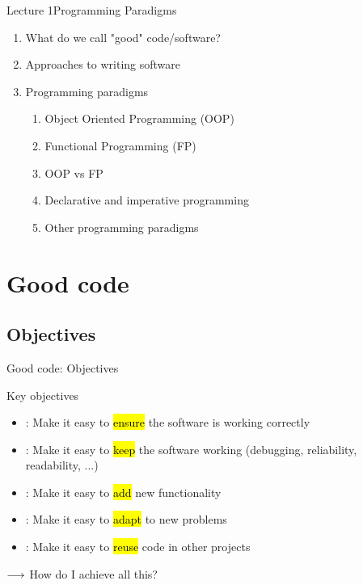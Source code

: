 \begin{frame}{Lecture 1}{Programming Paradigms}
	\begin{enumerate}
		\setlength{\itemsep}{3ex}
		\item What do we call "good" code/software?
		\item Approaches to writing software
		\item Programming paradigms\vspace{1ex}
		\begin{enumerate}[a]
			\setlength{\itemsep}{1ex}
			\item Object Oriented Programming (OOP)
			\item Functional Programming (FP)
			\item OOP vs FP
			\item Declarative and imperative programming
			\item Other programming paradigms
		\end{enumerate}
	\end{enumerate}
\end{frame}

\section{Good code}


\subsection{Objectives}


\begin{frame}{Good code: Objectives}
\begin{block}{Key objectives}{\relax}
	\begin{itemize}
		\item {}: Make it easy to \hl{ensure} the software is working correctly
		\item {}: Make it easy to \hl{keep} the software working (debugging, reliability, readability, ...)
		\item {}: Make it easy to \hl{add} new functionality
		\item {}: Make it easy to \hl{adapt} to new problems
		\item {}: Make it easy to \hl{reuse} code in other projects
	\end{itemize}
\end{block}

\bigskip
{\Large $\longrightarrow$ How do I achieve all this?}

\end{frame}


